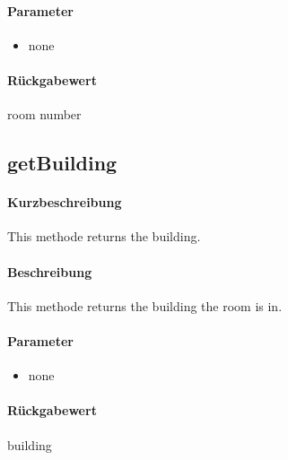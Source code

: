 \paragraph*{Parameter}
\begin{itemize}
    \item none
\end{itemize}
\paragraph*{Rückgabewert}
room number

\subsection{getBuilding}%
\paragraph*{Kurzbeschreibung}
This methode returns the building.
\paragraph*{Beschreibung}
This methode returns the building the room is in.
\paragraph*{Parameter}
\begin{itemize}
    \item none
\end{itemize}
\paragraph*{Rückgabewert}
building